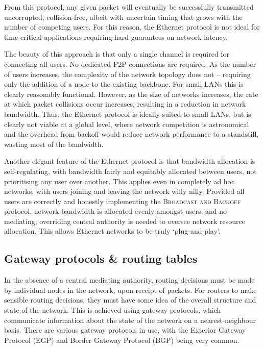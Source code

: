 \documentclass[aps, rmp, twocolumn, amsmath, amssymb, nofootinbib, superscriptaddress, longbibliography, floatfix, table-of-contents, eqsecnum]{revtex4-1}
\begin{document}
From this protocol, any given packet will eventually be successfully transmitted uncorrupted, collision-free, albeit with uncertain timing that grows with the number of competing users. For this reason, the Ethernet protocol is not ideal for time-critical applications requiring hard guarantees on network latency.

The beauty of this approach is that only a single channel is required for connecting all users. No dedicated P2P connections are required. As the number of users increases, the complexity of the network topology does not -- requiring only the addition of a node to the existing backbone. For small LANs this is clearly reasonably functional. However, as the size of networks increases, the rate at which packet collisions occur increases, resulting in a reduction in network bandwidth. Thus, the Ethernet protocol is ideally suited to small LANs, but is clearly not viable at a global level, where network competition is astronomical and the overhead from backoff would reduce network performance to a standstill, wasting most of the bandwidth.

Another elegant feature of the Ethernet protocol is that bandwidth allocation is self-regulating, with bandwidth fairly and equitably allocated between users, not prioritising any user over another. This applies even in completely ad hoc networks, with users joining and leaving the network willy nilly. Provided all users are correctly and honestly implementing the \textsc{Broadcast and Backoff} protocol, network bandwidth is allocated evenly amongst users, and no mediating, overriding central authority is needed to oversee network resource allocation. This allows Ethernet networks to be truly `plug-and-play'.

%
%

\subsection{Gateway protocols \& routing tables} \label{sec:gateway}  

In the absence of a central mediating authority, routing decisions must be made by individual nodes in the network, upon receipt of packets. For routers to make sensible routing decisions, they must have some idea of the overall structure and state of the network. This is achieved using gateway protocols, which communicate information about the state of the network on a nearest-neighbour basis. There are various gateway protocols in use, with the Exterior Gateway Protocol (EGP) and Border Gateway Protocol (BGP) being very common.
\end{document}
